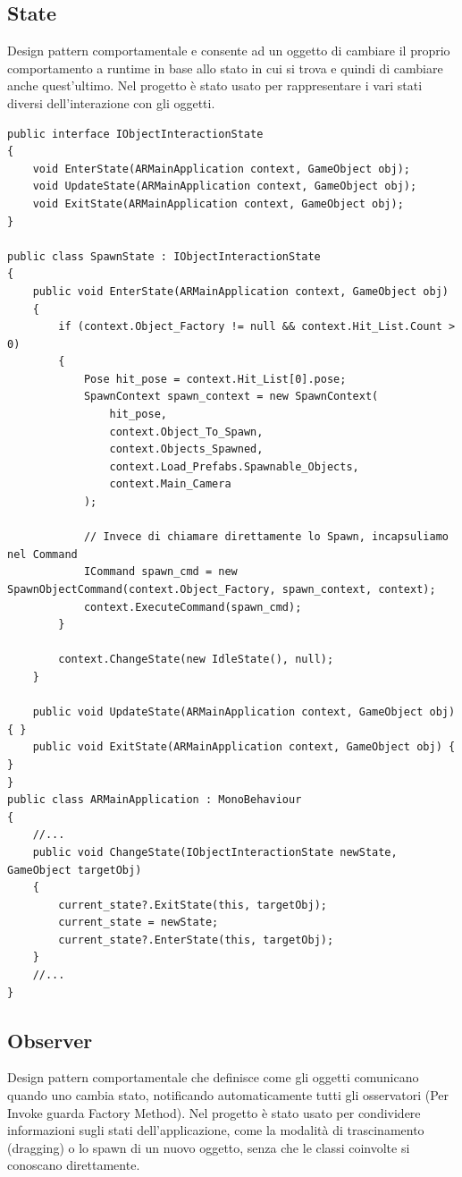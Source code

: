 \subsection{State}
Design pattern comportamentale e consente ad un oggetto di cambiare il proprio comportamento a runtime in base allo stato in cui si trova e quindi di cambiare anche quest'ultimo. Nel progetto è stato usato per rappresentare i vari stati diversi dell'interazione con gli oggetti.

\begin{lstlisting}[language={[Sharp]C}]
public interface IObjectInteractionState
{
    void EnterState(ARMainApplication context, GameObject obj);
    void UpdateState(ARMainApplication context, GameObject obj);
    void ExitState(ARMainApplication context, GameObject obj);
}

public class SpawnState : IObjectInteractionState
{
    public void EnterState(ARMainApplication context, GameObject obj)
    {
        if (context.Object_Factory != null && context.Hit_List.Count > 0)
        {
            Pose hit_pose = context.Hit_List[0].pose;
            SpawnContext spawn_context = new SpawnContext(
                hit_pose,
                context.Object_To_Spawn,
                context.Objects_Spawned,
                context.Load_Prefabs.Spawnable_Objects,
                context.Main_Camera
            );

            // Invece di chiamare direttamente lo Spawn, incapsuliamo nel Command
            ICommand spawn_cmd = new SpawnObjectCommand(context.Object_Factory, spawn_context, context);
            context.ExecuteCommand(spawn_cmd);
        }

        context.ChangeState(new IdleState(), null);
    }

    public void UpdateState(ARMainApplication context, GameObject obj) { }
    public void ExitState(ARMainApplication context, GameObject obj) { }
}
public class ARMainApplication : MonoBehaviour
{
    //...
    public void ChangeState(IObjectInteractionState newState, GameObject targetObj)
    {
        current_state?.ExitState(this, targetObj);
        current_state = newState;
        current_state?.EnterState(this, targetObj);
    }
    //...
}
\end{lstlisting}

\subsection{Observer}
Design pattern comportamentale che definisce come gli oggetti comunicano quando uno cambia stato, notificando automaticamente tutti gli osservatori (Per Invoke guarda Factory Method).
Nel progetto è stato usato per condividere informazioni sugli stati dell’applicazione, come la modalità di trascinamento (dragging) o lo spawn di un nuovo oggetto, senza che le classi coinvolte si conoscano direttamente.

